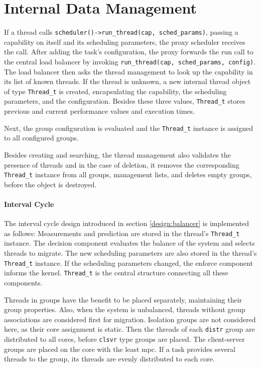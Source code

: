\section{Internal Data Management}
\label{impl:internal}

If a thread calls \texttt{scheduler()->run\_thread(cap, sched\_params)}, passing
a capability on itself and its scheduling parameters, the proxy scheduler
receives the call.
After adding the task's configuration, the proxy forwards the run call to the
central load balancer by invoking \texttt{run\_thread(cap, sched\_params, config)}.
The load balancer then asks the thread management to look up the capability in
its list of known threads.
If the thread is unknown, a new internal thread object of type
\texttt{Thread\_t} is created, encapsulating the capability, the scheduling
parameters, and the configuration.
Besides these three values, \texttt{Thread\_t} stores previous and current
performance values and execution times.

Next, the group configuration is evaluated and the \texttt{Thread\_t} instance
is assigned to all configured groups.

Besides creating and searching, the thread management also validates the
presence of threads and in the case of deletion, it removes the corresponding
\texttt{Thread\_t} instance from all groups, management lists, and deletes empty
groups, before the object is destroyed.


\paragraph{Interval Cycle}
The interval cycle design introduced in section \ref{design:balancer} is
implemented as follows:
Measurements and prediction are stored in the thread's \texttt{Thread\_t}
instance.
The decision component evaluates the balance of the system and selects threads
to migrate.
The new scheduling parameters are also stored in the thread's \texttt{Thread\_t}
instance.
If the scheduling parameters changed, the enforce component informs the kernel.
\texttt{Thread\_t} is the central structure connecting all these components.

Threads in groups have the benefit to be placed separately, maintaining their
group properties.
Also, when the system is unbalanced, threads without group associations are
considered first for migration.
Isolation groups are not considered here, as their core assignment is static.
Then the threads of each \texttt{distr} group are distributed to all cores, before
\texttt{clsvr} type groups are placed.
The client-server groups are placed on the core with the least \gls{mpc}.
If a task provides several threads to the group, its threads are evenly
distributed to each core.

